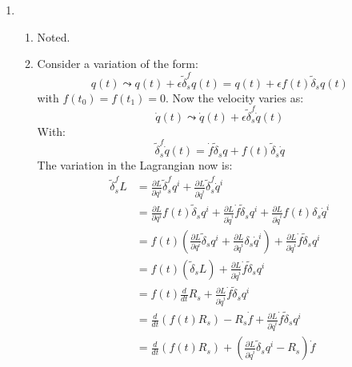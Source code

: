 \documentclass[12pt,a4]{article}
\begin{document}
\begin{enumerate}
\begin{enumerate}
    \end{enumerate}
  \item
    \begin{enumerate}
      \item
        Noted.
      \item
        Consider a variation of the form:
        \begin{equation*}
          q(t) \leadsto q(t) + \epsilon \tilde{\delta}^f_s q(t) = q(t) + \epsilon f(t) \tilde{\delta}_s q(t)
        \end{equation*}
        with $f(t_0) = f(t_1) = 0$.
        Now the velocity varies as:
        \begin{equation*}
          \dot q(t) \leadsto \dot q(t) + \epsilon \tilde{\delta}^f_s \dot q(t) 
        \end{equation*}
        With:
        \begin{equation*}
          \tilde{\delta}^f_s \dot q(t) = \dot f \tilde{\delta}_s q + f(t) \tilde{\delta}_s \dot q
        \end{equation*}
        The variation in the Lagrangian now is:
        \begin{align*}
          \tilde{\delta}_s^f L &= \frac{\partial L}{\partial q^i} \tilde{\delta}_s^fq^i + \frac{\partial L}{\partial \dot q^i} \tilde{\delta}_s^f\dot q^i\\
                               &= \frac{\partial L}{\partial q^i} f(t)\tilde{\delta}_sq^i + \frac{\partial L}{\partial \dot q^i} \dot f \tilde{\delta}_s q^i + \frac{\partial L}{\partial \dot q^i} f(t) {\delta}_s \dot q^i\\
                               &= f(t)\left(\frac{\partial L}{\partial q^i} \tilde{\delta}_sq^i + \frac{\partial L}{\partial \dot q^i} {\delta}_s \dot q^i\right) + \frac{\partial L}{\partial \dot q^i} \dot f \tilde{\delta}_s q^i \\
                               &= f(t)\left(\tilde{\delta}_sL \right) + \frac{\partial L}{\partial \dot q^i} \dot f \tilde{\delta}_s q^i \\
                               &= f(t)\frac{d}{dt} R_s + \frac{\partial L}{\partial \dot q^i} \dot f \tilde{\delta}_s q^i \\
                               &= \frac{d}{dt}\left(f(t) R_s\right) - R_s \dot f+ \frac{\partial L}{\partial \dot q^i} \dot f \tilde{\delta}_s q^i \\
                               &= \frac{d}{dt}\left(f(t) R_s\right) + \left(\frac{\partial L}{\partial \dot q^i}\tilde{\delta}_s q^i - R_s\right)\dot f\\

\end{align*}
\end{enumerate}
\end{enumerate}
\end{document}
